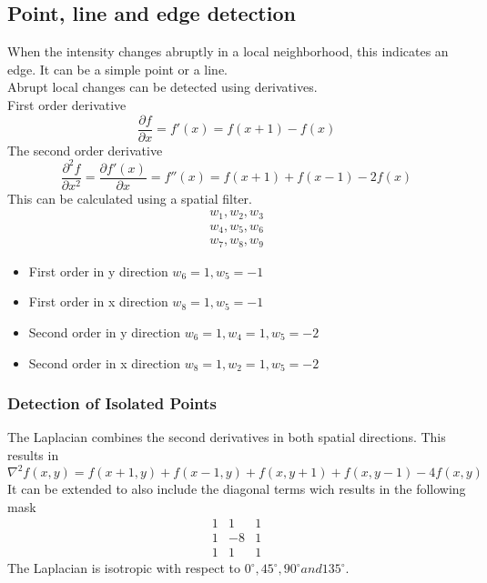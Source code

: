 \subsection{Point, line and edge detection}
When the intensity changes abruptly in a local neighborhood, this indicates an edge. It can be a simple point or a line.\\
Abrupt local changes can be detected using derivatives.\\
First order derivative
\[
	\frac{\partial f}{\partial x} = f'(x)=f(x+1)-f(x)
\]
The second order derivative
\[
	\frac{\partial^2f}{\partial x^2}=\frac{\partial f'(x)}{\partial x}=f''(x)=f(x+1)+f(x-1)-2f(x)
\]
This can be calculated using a spatial filter.
\[
	\begin{matrix}
	w_1, w_2, w_3\\
	w_4, w_5, w_6\\
	w_7, w_8, w_9
	\end{matrix}
\]
\begin{itemize}
\item First order in y direction $w_6=1, w_5=-1$
\item First order in x direction $w_8=1, w_5=-1$
\item Second order in y direction $w_6=1, w_4=1, w_5=-2$
\item Second order in x direction $w_8=1, w_2=1, w_5=-2$
\end{itemize}
\subsubsection{Detection of Isolated Points}
The Laplacian combines the second derivatives in both spatial directions. This results in
\[
	\nabla^2f(x,y)=f(x+1,y)+f(x-1,y)+f(x,y+1)+f(x,y-1)-4f(x,y)
\]
It can be extended to also include the diagonal terms wich results in the following mask
\[
	\begin{matrix}
	 1 & 1 & 1\\
	 1 & -8 & 1\\
	 1 & 1 & 1
	\end{matrix}
\]
The Laplacian is isotropic with respect to $0^\circ, 45^\circ, 90^\circ and 135^\circ$. 

